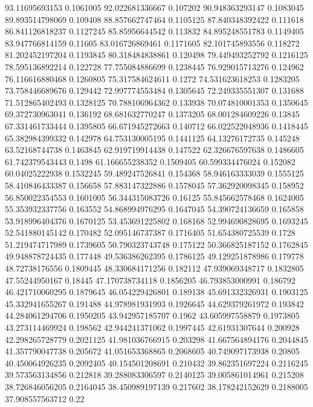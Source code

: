 93.11695693153 0.1061005
92.022681336667 0.107202
90.948363293147 0.1083045
89.893514798069 0.109408
88.857662747464 0.1105125
87.840348392422 0.111618
86.841126818237 0.1127245
85.85956644542 0.113832
84.895248551783 0.1149405
83.947766814159 0.11605
83.016726869461 0.1171605
82.101745893556 0.118272
81.202452197204 0.1193845
80.318484838861 0.120498
79.449493252792 0.1216125
78.595136892214 0.122728
77.755084886699 0.1238445
76.929015713276 0.124962
76.116616880468 0.1260805
75.317584624611 0.1272
74.531623618253 0.1283205
73.758446689676 0.129442
72.997774553484 0.1305645
72.249335551307 0.131688
71.512865402493 0.1328125
70.788106964362 0.133938
70.074810001353 0.1350645
69.372730963041 0.136192
68.681632770247 0.1373205
68.001284609226 0.13845
67.331461733444 0.1395805
66.671945272663 0.140712
66.022522048936 0.1418445
65.382984399332 0.142978
64.753130005195 0.1441125
64.13276172735 0.145248
63.52168744738 0.1463845
62.919719914438 0.147522
62.326676597638 0.1486605
61.742379543443 0.1498
61.166655238352 0.1509405
60.599334476024 0.152082
60.04025222938 0.1532245
59.489247526841 0.154368
58.946163333039 0.1555125
58.410846433387 0.156658
57.883147322886 0.1578045
57.362920098345 0.158952
56.850022354553 0.1601005
56.344315083726 0.16125
55.845662578468 0.1624005
55.353932337756 0.163552
54.868994976295 0.1647045
54.390724136659 0.165858
53.918996404376 0.1670125
53.453691225802 0.168168
52.994690828695 0.1693245
52.541880145142 0.170482
52.095146737387 0.1716405
51.654380725539 0.1728
51.219474717989 0.1739605
50.790323743748 0.175122
50.366825187152 0.1762845
49.948878724435 0.177448
49.536386262395 0.1786125
49.129251878986 0.179778
48.72738176556 0.1809445
48.330684171256 0.182112
47.939069348717 0.1832805
47.55244950167 0.18445
47.170738734118 0.1856205
46.793853000991 0.186792
46.421710060295 0.1879645
46.054229426801 0.189138
45.691332326931 0.1903125
45.332941655267 0.191488
44.978981931993 0.1926645
44.629379261972 0.193842
44.284061294706 0.1950205
43.942957185707 0.1962
43.605997558879 0.1973805
43.273114469924 0.198562
42.944241371062 0.1997445
42.61931307644 0.200928
42.298265728779 0.2021125
41.981036766915 0.203298
41.667564894176 0.2044845
41.357790047738 0.205672
41.051653368865 0.2068605
40.749097173938 0.20805
40.450064926235 0.2092405
40.154501208691 0.210432
39.862351697224 0.2116245
39.573563134856 0.212818
39.288083306597 0.2140125
39.005861014961 0.215208
38.726846056205 0.2164045
38.450989197139 0.217602
38.178242152629 0.2188005
37.908557563712 0.22

